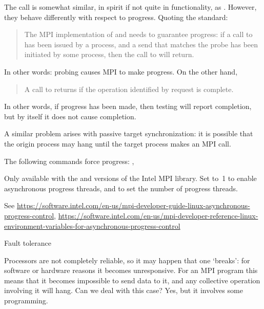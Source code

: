 \begin{remark}
  The  call is somewhat similar,
  in spirit if not quite in functionality,
  as . However, they behave differently with respect to progress.
  Quoting the standard:
  \begin{quote}
    The MPI implementation of  and
     needs to guarantee progress: if a call
    to  has been issued by a process, and a send that matches
    the probe has been initiated by some process, then the call to
     will return.
  \end{quote}
  In other words: probing causes MPI to make progress.
  On the other hand,
  \begin{quote}
    A call to  returns 
    if the operation identified by request is complete.
  \end{quote}
  In other words, if progress has been made, then testing will report completion,
  but by itself it does not cause completion.
\end{remark}

A similar problem arises with passive target synchronization:
it is possible that the origin process may hang until 
the target process makes an MPI call.

The following commands force progress:
,

\begin{intelnote}
  Only available with the 
  and  versions of the Intel MPI library.
  Set  to~1 to enable asynchronous progress threads,
  and  to set the number of progress threads.

  See \url{https://software.intel.com/en-us/mpi-developer-guide-linux-asynchronous-progress-control},
  \url{https://software.intel.com/en-us/mpi-developer-reference-linux-environment-variables-for-asynchronous-progress-control}
\end{intelnote}

 {Fault tolerance}
\label{mpi:tolerant}

Processors are not completely reliable, so it may happen that one
`breaks': for software or hardware reasons it becomes
unresponsive. For an MPI program this means that it becomes impossible
to send data to it, and any collective operation involving it will
hang. Can we deal with this case? Yes, but it involves some
programming.

